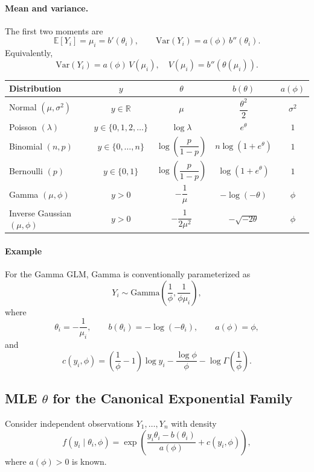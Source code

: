 \documentclass[11pt]{article}
\theoremstyle{definition}
\begin{document}
\paragraph{Mean and variance.}
The first two moments are
\[
\mathbb{E}[Y_i] = \mu_i = b'(\theta_i),
\qquad
\mathrm{Var}(Y_i) = a(\phi)\, b''(\theta_i).
\]
Equivalently,
\[
\mathrm{Var}(Y_i) = a(\phi)\, V(\mu_i),
\quad
V(\mu_i) = b''(\theta(\mu_i)).
\]
\begin{center}
\renewcommand{\arraystretch}{1.4}
\begin{tabular}{lcccc}
\hline
Distribution
& $y$
& $\theta$
& $b(\theta)$
& $a(\phi)$
\\
\hline
Normal $(\mu,\sigma^2)$
& $y\in\mathbb{R}$
& $\mu$
& $\dfrac{\theta^2}{2}$
& $\sigma^2$
\\[6pt]

Poisson $(\lambda)$
& $y\in\{0,1,2,\dots\}$
& $\log\lambda$
& $e^{\theta}$
& $1$
\\[6pt]

Binomial $(n,p)$
& $y\in\{0,\dots,n\}$
& $\log\!\left(\dfrac{p}{1-p}\right)$
& $n\log(1+e^{\theta})$
& $1$
\\[6pt]

Bernoulli $(p)$
& $y\in\{0,1\}$
& $\log\!\left(\dfrac{p}{1-p}\right)$
& $\log(1+e^{\theta})$
& $1$
\\[6pt]

Gamma $(\mu,\phi)$
& $y>0$
& $-\dfrac{1}{\mu}$
& $-\log(-\theta)$
& $\phi$
\\[6pt]

Inverse Gaussian $(\mu,\phi)$
& $y>0$
& $-\dfrac{1}{2\mu^2}$
& $-\sqrt{-2\theta}$
& $\phi$
\\
\hline
\end{tabular}
\end{center}

\paragraph{Example}

For the Gamma GLM, Gamma is conventionally parameterized as
\[
Y_i \sim \mathrm{Gamma}\left(\frac{1}{\phi},\frac{1}{\phi\mu_i}\right),
\]
where
\[
\theta_i=-\frac{1}{\mu_i},\qquad
b(\theta_i)=-\log(-\theta_i),\qquad
a(\phi)=\phi,
\]
and
\[
c(y_i,\phi)
=
\left(\frac{1}{\phi}-1\right)\log y_i
-\frac{\log\phi}{\phi}
-\log\Gamma\left(\frac{1}{\phi}\right).
\]

\subsection{MLE $\theta$ for the Canonical Exponential Family}
Consider independent observations $Y_1,\dots,Y_n$ with density
\[
f(y_i \mid \theta_i,\phi)
=
\exp\!\left(
\frac{y_i \theta_i - b(\theta_i)}{a(\phi)}
+ c(y_i,\phi)
\right),
\]
where $a(\phi)>0$ is known.
\end{document}
